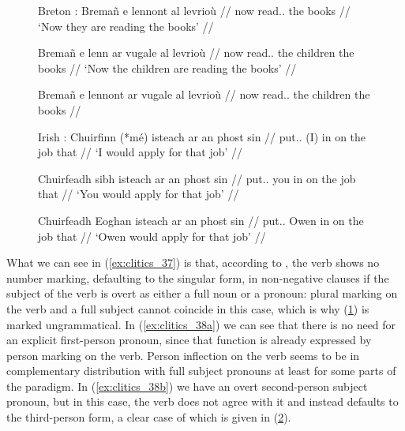 \begin{figure}
\pex\label{ex:clitics_37}
Breton \parencites[145]{spencerluis2012}[from][]{borsleyetal2007}:
\a\label{ex:clitics_37a}
\begingl
	\gla Bremañ e lennont al levrioù //
	\glb now \Prt{} read.\Prs{}.\Tpl{} the books //
	\glft `Now they are reading the books' //
\endgl

\a\label{ex:clitics_37b}\begingl
	\gla Bremañ e lenn ar vugale al levrioù //
	\glb now \Prt{} read.\Prs{}.\Tsg{} the children the books //
	\glft `Now the children are reading the books' //
\endgl

\a\label{ex:clitics_37c}\ljudge{*}\begingl
	\gla Bremañ e lennont ar vugale al levrioù //
	\glb now \Prt{} read.\Prs{}.\Tpl{} the children the books //
\endgl
\xe
\end{figure}

\begin{figure}
\pex\label{ex:clitics_38}
Irish \parencites[145]{spencerluis2012}[from][]{mccloskeyhale1984}:
\a\label{ex:clitics_38a}
\begingl
	\gla Chuirfinn \textup{(}*mé\textup{)} isteach ar an phost sin //
	\glb put.\Cond{}.\Fsg{} (​I​) in on the job that //
	\glft `I would apply for that job' //
\endgl

\a\label{ex:clitics_38b}\begingl
	\gla Chuirfeadh sibh isteach ar an phost sin //
	\glb put.\Cond{}.\Tsg{} you in on the job that //
	\glft `You would apply for that job' //
\endgl

\a\label{ex:clitics_38c}\begingl
	\gla Chuirfeadh Eoghan isteach ar an phost sin //
	\glb put.\Cond{}.\Tsg{} Owen in on the job that //
	\glft `Owen would apply for that job' //
\endgl
\xe
\end{figure}

What we can see in (\ref{ex:clitics_37}) is that, according to
\citet{spencerluis2012}, the verb shows no number marking, defaulting to the
singular form, in non-negative clauses if the subject of the verb is overt as
either a full noun or a pronoun: plural marking on the verb and a full subject
cannot coincide in this case, which is why (\ref{ex:clitics_37c}) is marked
ungrammatical. In (\ref{ex:clitics_38a}) we can see that there is no need for
an explicit first-person pronoun, since that function is already expressed by
person marking on the verb. Person inflection on the verb seems to be in
complementary distribution with full subject pronouns at least for some parts
of the paradigm. In (\ref{ex:clitics_38b}) we have an overt second-person
subject pronoun, but in this case, the verb does not agree with it and instead
defaults to the third-person form, a clear case of which is given in
(\ref{ex:clitics_38c}).

